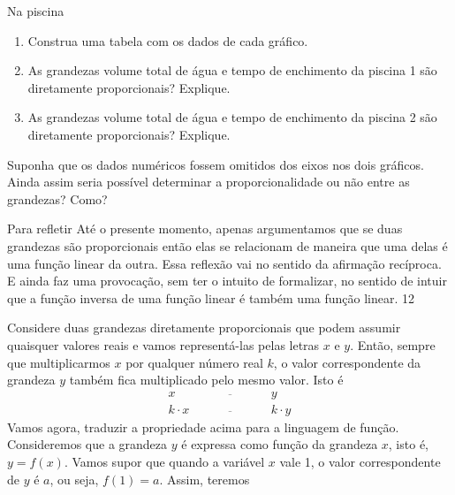 \begin{task}{Na piscina}
\begin{figure}[H]
\end{figure}

\begin{enumerate}
\item {} 
Construa uma tabela com os dados de cada gráfico.

\item {} 
As grandezas volume total de água e tempo de enchimento da piscina 1 são diretamente proporcionais? Explique.

\item {} 
As grandezas volume total de água e tempo de enchimento da piscina 2 são diretamente proporcionais? Explique.

\end{enumerate}
\end{task}

\begin{reflection}

Suponha que os dados numéricos fossem omitidos dos eixos nos dois gráficos. Ainda assim seria possível determinar a proporcionalidade ou não entre as grandezas? Como?
\end{reflection}

\clearpage
\def\currentcolor{session4}
\begin{sugestions}{Para refletir}
{
  Até o presente momento, apenas argumentamos que se duas grandezas são proporcionais então elas se relacionam de maneira que uma delas é uma função linear da outra. Essa reflexão vai no sentido da afirmação recíproca. E ainda faz uma provocação, sem ter o intuito de formalizar, no sentido de intuir que a função inversa de uma função linear é também uma função linear.
}{1}{2}
\end{sugestions}

\label{\detokenize{AF107-1::doc}}\label{\detokenize{AF107-1:organizando-as-ideias-funcao-linear}}
Considere duas grandezas diretamente proporcionais que podem assumir quaisquer valores reais e vamos representá-las pelas letras \(x\) e \(y\). Então, sempre que multiplicarmos \(x\) por qualquer número real \(k\), o valor correspondente da grandeza \(y\) também fica multiplicado pelo mesmo valor. Isto é
\[\begin{array}{ccc}
x\quad &\overline{\quad \quad \quad}& \quad y \\
k\cdot x \quad &\overline{\quad \quad \quad}& \quad k\cdot y
  \end{array}\]
Vamos agora, traduzir a propriedade acima para a linguagem de função. Consideremos que a grandeza \(y\) é expressa como função da grandeza \(x\), isto é, \(y=f(x)\). Vamos supor que quando a variável $x$ vale 1, o valor correspondente de $y$ é $a$, ou seja, $f(1)=a$. Assim, teremos

